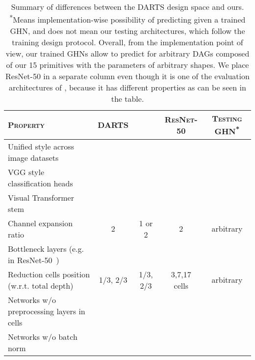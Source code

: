 \begin{table}[thbp]
	\centering
	\caption{\small Summary of differences between the DARTS design space and ours. \textsuperscript{*}Means implementation-wise possibility of predicting \params given a trained GHN, and does not mean our testing \iid architectures, which follow the training design protocol. Overall, from the implementation point of view, our trained GHNs allow to predict \params for arbitrary DAGs composed of our 15 primitives with the parameters of arbitrary shapes. We place ResNet-50 in a separate column even though it is one of the evaluation architectures of \dataset, because it has different properties as can be seen in the table.}
	\label{tab:darts_diff}
	\vspace{3pt}
	\setlength{\tabcolsep}{2.5pt}
	\small
	\begin{tabular}{lcccc}
		\toprule
		
		\textbf{\textsc{Property}} & \textbf{\textsc{DARTS}} & \textbf{\textsc{\dataset}} & \textbf{\textsc{ResNet-50}} & \textbf{\textsc{Testing GHN}}\textsuperscript{*} \\
		\midrule
		
		Unified style across image datasets & \xmark & \cmark & \xmark & \cmark \\
		
		VGG style classification heads~\cite{simonyan2014very} & \xmark & \cmark & \xmark & \cmark \\
		
		Visual Transformer stem~\cite{dosovitskiy2020image} & \xmark & \cmark & \xmark & \cmark \\
		
		Channel expansion ratio & 2 & 1 or 2 & 2 & arbitrary \\
		
		Bottleneck layers (e.g. in ResNet-50~\cite{he2016deep}) & \xmark & \xmark & \cmark & \cmark \\
		
		Reduction cells position (w.r.t. total depth) & 1/3, 2/3 & 1/3, 2/3 & 3,7,17 cells & arbitrary \\
		
		Networks w/o  preprocessing layers in cells & \xmark & \cmark & \cmark & \cmark \\
		
		Networks w/o batch norm & \xmark & \cmark & \xmark & \cmark \\
		
		\bottomrule
	\end{tabular}
\end{table}

